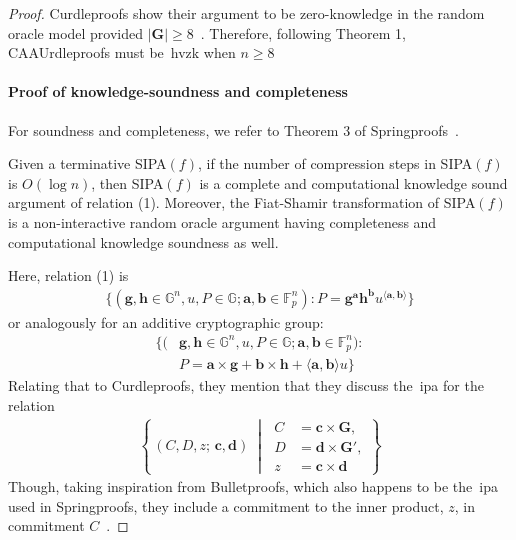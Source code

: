 \begin{proof}
    Curdleproofs show their argument to be zero-knowledge in the random oracle model provided $|\mathbf{G}|\geq8$~\cite{Curdleproofs}.
    Therefore, following Theorem 1, CAAUrdleproofs must be~\gls{hvzk} when $n\geq8$

    \paragraph*{\textbf{Proof of knowledge-soundness and completeness}}
    For soundness and completeness, we refer to Theorem 3 of Springproofs~\cite{zhang2024springproofs}.
    \begin{theorem}
        Given a terminative SIPA$(f)$, if the number of compression steps in SIPA$(f)$ is $O(\log n)$, then SIPA$(f)$ is a complete and computational knowledge sound argument of relation (1).
        Moreover, the Fiat-Shamir transformation of SIPA$(f)$ is a non-interactive random oracle argument having completeness and computational knowledge soundness as well.
    \end{theorem}
    Here, relation (1) is
    \begin{align}
        \{(\mathbf{g},\mathbf{h}\in\mathbb{G}^n,u,P\in\mathbb{G};\mathbf{a},\mathbf{b}\in\mathbb{F}_p^n):P=\mathbf{g}^\mathbf{a}\mathbf{h}^\mathbf{b}u^{\langle \mathbf{a},\mathbf{b}\rangle}\}
    \end{align}
    or analogously for an additive cryptographic group:
    \begin{align}
        \{(&\mathbf{g},\mathbf{h}\in\mathbb{G}^n,u,P\in\mathbb{G};\mathbf{a},\mathbf{b}\in\mathbb{F}_p^n):\\
        &P=\mathbf{a}\times\mathbf{g}+\mathbf{b}\times\mathbf{h}+\langle \mathbf{a},\mathbf{b}\rangle u\}\label{al:P}
    \end{align}
    Relating that to Curdleproofs, they mention that they discuss the~\gls{ipa} for the relation
    \begin{align}
        \left\{
        \,(C,D,z;\,\mathbf{c},\mathbf{d})\;\middle|\;
        \begin{aligned}
            C &= \mathbf{c} \times \mathbf{G},\\
            D &= \mathbf{d} \times \mathbf{G'},\\
            z &= \mathbf{c} \times \mathbf{d}
        \end{aligned}
        \right\}
    \end{align}
    Though, taking inspiration from Bulletproofs, which also happens to be the~\gls{ipa} used in Springproofs, they include a commitment to the inner product, $z$, in commitment $C$~\cite{bunz2018bulletproofs}.

\end{proof}
